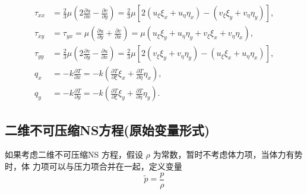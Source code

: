 \documentclass[12pt]{article}
\begin{document}
\begin{equation}
	\begin{aligned}
		\tau_{x x} & =\frac{2}{3} \mu\left(2 \frac{\partial u}{\partial x}-\frac{\partial v}{\partial y}\right)=\frac{2}{3} \mu\left[2\left(u_{\xi} \xi_{x}+u_{\eta} \eta_{x}\right)-\left(v_{\xi} \xi_{y}+v_{\eta} \eta_{y}\right)\right], \\
		\tau_{x y} & =\tau_{y x}=\mu\left(\frac{\partial u}{\partial y}+\frac{\partial v}{\partial x}\right)=\mu\left(u_{\xi} \xi_{y}+u_{\eta} \eta_{y}+v_{\xi} \xi_{x}+v_{\eta} \eta_{x}\right),                                           \\
		\tau_{y y} & =\frac{2}{3} \mu\left(2 \frac{\partial v}{\partial y}-\frac{\partial u}{\partial x}\right)=\frac{2}{3} \mu\left[2\left(v_{\xi} \xi_{y}+v_{\eta} \eta_{y}\right)-\left(u_{\xi} \xi_{x}+u_{\eta} \eta_{x}\right)\right], \\
		q_{x}      & =-k \frac{\partial T}{\partial x}=-k\left(\frac{\partial T}{\partial \xi} \xi_{x}+\frac{\partial T}{\partial \eta} \eta_{x}\right),                                                                                    \\
		q_{y}      & =-k \frac{\partial T}{\partial y}=-k\left(\frac{\partial T}{\partial \xi} \xi_{y}+\frac{\partial T}{\partial \eta} \eta_{y}\right) .
	\end{aligned}
\end{equation}

\subsection{二维不可压缩NS方程(原始变量形式)}

如果考虑二维不可压缩NS 方程，假设 $\rho$ 为常数，暂时不考虑体力项，当体力有势时，体 力项可以与压力项合并在一起，定义变量
\begin{equation}
	\tilde{p}=\frac{p}{\rho}
\end{equation}
\end{document}
